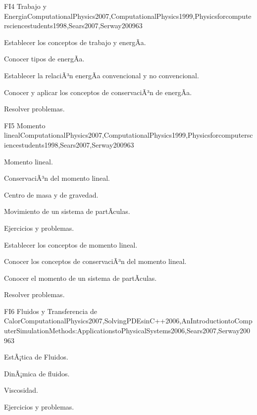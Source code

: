 \begin{syllabus}
\begin{unit}{FI4 Trabajo y Energia}{ComputationalPhysics2007,ComputationalPhysics1999,Physicsforcomputersciencestudents1998,Sears2007,Serway2009}{6}{3}
   \begin{learningoutcomes}
      \item Establecer los conceptos de trabajo y energÃ­a.
      \item Conocer tipos de energÃ­a.
      \item Establecer la relaciÃ³n energÃ­a convencional y no convencional.
      \item Conocer y aplicar los conceptos de conservaciÃ³n de energÃ­a.
      \item Resolver problemas.
   \end{learningoutcomes}
\end{unit}

\begin{unit}{FI5 Momento lineal}{ComputationalPhysics2007,ComputationalPhysics1999,Physicsforcomputersciencestudents1998,Sears2007,Serway2009}{6}{3}
\begin{topics}
      \item Momento lineal.
      \item ConservaciÃ³n del momento lineal.
      \item Centro de masa y de gravedad.
      \item Movimiento de un sistema de partÃ­culas.
      \item Ejercicios y problemas.
  \end{topics}

   \begin{learningoutcomes}
      \item Establecer los conceptos de momento lineal.
      \item Conocer los conceptos de conservaciÃ³n del momento lineal.
      \item Conocer el momento de un sistema de partÃ­culas.
      \item Resolver problemas.
   \end{learningoutcomes}
\end{unit}

\begin{unit}{FI6 Fluidos y Transferencia de Calor}{ComputationalPhysics2007,SolvingPDEsinC++2006,AnIntroductiontoComputerSimulationMethods:ApplicationstoPhysicalSystems2006,Sears2007,Serway2009}{6}{3}
\begin{topics}
      \item EstÃ¡tica de Fluidos.
      \item DinÃ¡mica de fluidos. 
      \item Viscosidad.
      \item Ejercicios y problemas.
  \end{topics}


\end{unit}
\end{syllabus}
